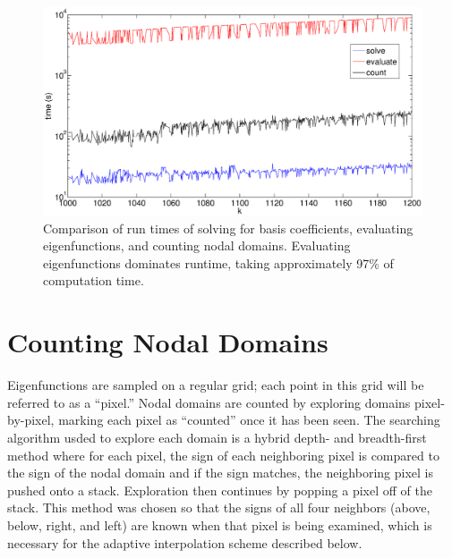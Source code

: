 \documentclass{report}
\begin{document}
\begin{figure}
  \begin{center}
    \includegraphics[width=\textwidth]{figs/timing/timing_comp_1000_to_1200.eps}
    \caption{Comparison of run times of solving for basis coefficients, evaluating eigenfunctions, and counting nodal domains. Evaluating eigenfunctions dominates runtime, taking approximately 97\% of computation time.}
    \label{fig:timing}
  \end{center}
\end{figure}


\section{Counting Nodal Domains}
Eigenfunctions are sampled on a regular grid; each point in this grid will be referred to as a ``pixel.'' Nodal domains are counted by exploring domains pixel-by-pixel, marking each pixel as ``counted'' once it has been seen. The searching algorithm usded to explore each domain is a hybrid depth- and breadth-first method where for each pixel, the sign of each neighboring pixel is compared to the sign of the nodal domain and if the sign matches, the neighboring pixel is pushed onto a stack. Exploration then continues by popping a pixel off of the stack. This method was chosen so that the signs of all four neighbors (above, below, right, and left) are known when that pixel is being examined, which is necessary for the adaptive interpolation scheme described below.
\end{document}
